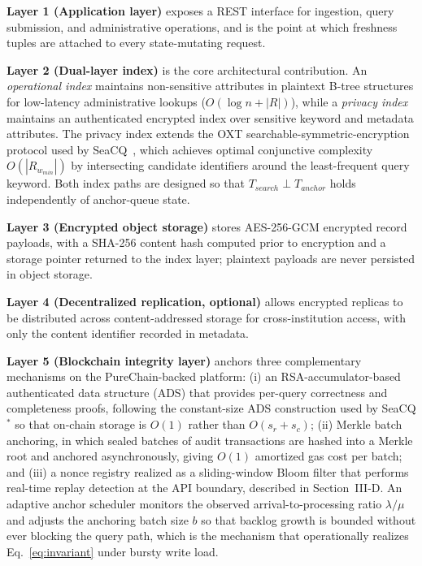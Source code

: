 \textbf{Layer 1 (Application layer)} exposes a REST interface for ingestion, query submission, and administrative operations, and is the point at which freshness tuples are attached to every state-mutating request.

\textbf{Layer 2 (Dual-layer index)} is the core architectural contribution. An \emph{operational index} maintains non-sensitive attributes in plaintext B-tree structures for low-latency administrative lookups ($O(\log n + |R|)$), while a \emph{privacy index} maintains an authenticated encrypted index over sensitive keyword and metadata attributes. The privacy index extends the OXT searchable-symmetric-encryption protocol used by SeaCQ~\cite{Yang}, which achieves optimal conjunctive complexity $O(|R_{w_{min}}|)$ by intersecting candidate identifiers around the least-frequent query keyword. Both index paths are designed so that $T_{search} \perp T_{anchor}$ holds independently of anchor-queue state.

\textbf{Layer 3 (Encrypted object storage)} stores AES-256-GCM encrypted record payloads, with a SHA-256 content hash computed prior to encryption and a storage pointer returned to the index layer; plaintext payloads are never persisted in object storage.

\textbf{Layer 4 (Decentralized replication, optional)} allows encrypted replicas to be distributed across content-addressed storage for cross-institution access, with only the content identifier recorded in metadata.

\textbf{Layer 5 (Blockchain integrity layer)} anchors three complementary mechanisms on the PureChain-backed platform: (i) an RSA-accumulator-based authenticated data structure (ADS) that provides per-query correctness and completeness proofs, following the constant-size ADS construction used by SeaCQ$^{*}$ so that on-chain storage is $O(1)$ rather than $O(s_r+s_c)$; (ii) Merkle batch anchoring, in which sealed batches of audit transactions are hashed into a Merkle root and anchored asynchronously, giving $O(1)$ amortized gas cost per batch; and (iii) a nonce registry realized as a sliding-window Bloom filter that performs real-time replay detection at the API boundary, described in Section~III-D. An adaptive anchor scheduler monitors the observed arrival-to-processing ratio $\lambda/\mu$ and adjusts the anchoring batch size $b$ so that backlog growth is bounded without ever blocking the query path, which is the mechanism that operationally realizes Eq.~\eqref{eq:invariant} under bursty write load.

